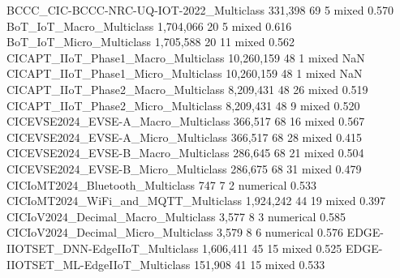 BCCC_CIC-BCCC-NRC-UQ-IOT-2022_Multiclass                                331,398       69       5         mixed   0.570
BoT_IoT_Macro_Multiclass                                              1,704,066       20       5         mixed   0.616
BoT_IoT_Micro_Multiclass                                              1,705,588       20      11         mixed   0.562
CICAPT_IIoT_Phase1_Macro_Multiclass                                  10,260,159       48       1         mixed                                         NaN
CICAPT_IIoT_Phase1_Micro_Multiclass                                  10,260,159       48       1         mixed                                         NaN
CICAPT_IIoT_Phase2_Macro_Multiclass                                   8,209,431       48      26         mixed   0.519
CICAPT_IIoT_Phase2_Micro_Multiclass                                   8,209,431       48       9         mixed   0.520
CICEVSE2024_EVSE-A_Macro_Multiclass                                     366,517       68      16         mixed   0.567
CICEVSE2024_EVSE-A_Micro_Multiclass                                     366,517       68      28         mixed   0.415
CICEVSE2024_EVSE-B_Macro_Multiclass                                     286,645       68      21         mixed   0.504
CICEVSE2024_EVSE-B_Micro_Multiclass                                     286,675       68      31         mixed   0.479
CICIoMT2024_Bluetooth_Multiclass                                            747        7       2     numerical   0.533
CICIoMT2024_WiFi_and_MQTT_Multiclass                                  1,924,242       44      19         mixed   0.397
CICIoV2024_Decimal_Macro_Multiclass                                       3,577        8       3     numerical   0.585
CICIoV2024_Decimal_Micro_Multiclass                                       3,579        8       6     numerical   0.576
EDGE-IIOTSET_DNN-EdgeIIoT_Multiclass                                  1,606,411       45      15         mixed   0.525
EDGE-IIOTSET_ML-EdgeIIoT_Multiclass                                     151,908       41      15         mixed   0.533
